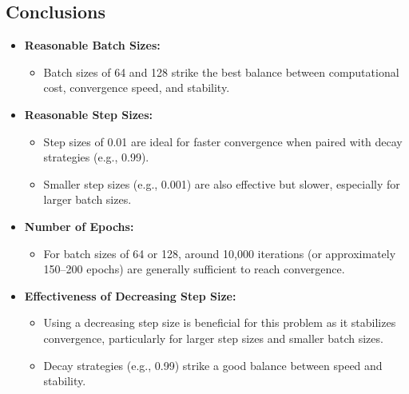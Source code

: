 \documentclass[12pt]{article}
\begin{document}
\subsection*{Conclusions}
\begin{itemize}
    \item \textbf{Reasonable Batch Sizes:}
    \begin{itemize}
        \item Batch sizes of 64 and 128 strike the best balance between computational cost, convergence speed, and stability.
    \end{itemize}
    \item \textbf{Reasonable Step Sizes:}
    \begin{itemize}
        \item Step sizes of 0.01 are ideal for faster convergence when paired with decay strategies (e.g., 0.99).
        \item Smaller step sizes (e.g., 0.001) are also effective but slower, especially for larger batch sizes.
    \end{itemize}
    \item \textbf{Number of Epochs:}
    \begin{itemize}
        \item For batch sizes of 64 or 128, around 10,000 iterations (or approximately 150–200 epochs) are generally sufficient to reach convergence.
    \end{itemize}
    \item \textbf{Effectiveness of Decreasing Step Size:}
    \begin{itemize}
        \item Using a decreasing step size is beneficial for this problem as it stabilizes convergence, particularly for larger step sizes and smaller batch sizes.
        \item Decay strategies (e.g., 0.99) strike a good balance between speed and stability.
    \end{itemize}
\end{itemize}
\end{document}
